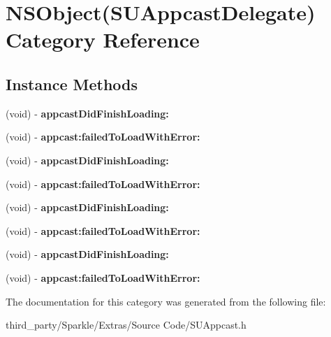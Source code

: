 \hypertarget{category_n_s_object_07_s_u_appcast_delegate_08}{}\section{N\+S\+Object(S\+U\+Appcast\+Delegate) Category Reference}
\label{category_n_s_object_07_s_u_appcast_delegate_08}
\subsection*{Instance Methods}
\begin{DoxyCompactItemize}
\item 
\mbox{\label{category_n_s_object_07_s_u_appcast_delegate_08_aa598973e84725caf1d5f0ecfd438db60}} 
(void) -\/ {\bfseries appcast\+Did\+Finish\+Loading\+:}
\item 
\mbox{\label{category_n_s_object_07_s_u_appcast_delegate_08_a5dd5ab13d7cf300282963aaf279f77eb}} 
(void) -\/ {\bfseries appcast\+:failed\+To\+Load\+With\+Error\+:}
\item 
\mbox{\label{category_n_s_object_07_s_u_appcast_delegate_08_aa598973e84725caf1d5f0ecfd438db60}} 
(void) -\/ {\bfseries appcast\+Did\+Finish\+Loading\+:}
\item 
\mbox{\label{category_n_s_object_07_s_u_appcast_delegate_08_a5dd5ab13d7cf300282963aaf279f77eb}} 
(void) -\/ {\bfseries appcast\+:failed\+To\+Load\+With\+Error\+:}
\item 
\mbox{\label{category_n_s_object_07_s_u_appcast_delegate_08_aa598973e84725caf1d5f0ecfd438db60}} 
(void) -\/ {\bfseries appcast\+Did\+Finish\+Loading\+:}
\item 
\mbox{\label{category_n_s_object_07_s_u_appcast_delegate_08_a5dd5ab13d7cf300282963aaf279f77eb}} 
(void) -\/ {\bfseries appcast\+:failed\+To\+Load\+With\+Error\+:}
\item 
\mbox{\label{category_n_s_object_07_s_u_appcast_delegate_08_aa598973e84725caf1d5f0ecfd438db60}} 
(void) -\/ {\bfseries appcast\+Did\+Finish\+Loading\+:}
\item 
\mbox{\label{category_n_s_object_07_s_u_appcast_delegate_08_a5dd5ab13d7cf300282963aaf279f77eb}} 
(void) -\/ {\bfseries appcast\+:failed\+To\+Load\+With\+Error\+:}
\end{DoxyCompactItemize}


The documentation for this category was generated from the following file\+:\begin{DoxyCompactItemize}
\item 
third\+\_\+party/\+Sparkle/\+Extras/\+Source Code/S\+U\+Appcast.\+h\end{DoxyCompactItemize}

